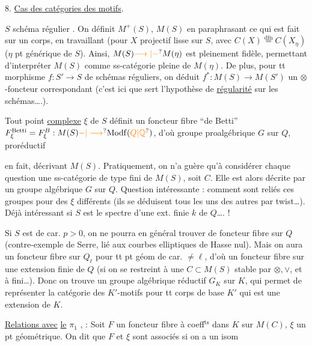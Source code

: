 8. \uline{Cas des catégories des motifs}. 

$S$ schéma régulier . On définit $M^+(S)$, $M(S)$ en paraphrasant ce qui est fait sur un corps, en travaillant (pour $X$ projectif lisse sur $S$, avec $C(X)\overset{\mathrm{dfn}}=C(X_\eta)$ ($\eta$ pt générique de $S$). Ainsi, $M(S)\unsure{\longrightarrow|-}M(\eta)$ est pleinement fidèle, permettant d'interpréter $M(S)$ comme ss-catégorie pleine de $M(\eta)$. De plus, pour tt morphisme $f:S'\longrightarrow S$ de schémas réguliers, on déduit $f^*:M(S)\longrightarrow M(S')$ un $\otimes$-foncteur correspondant (c'est ici que sert l'hypothèse de \uline{régularité} sur les schémas\ldots.).

Tout point  \uline{complexe} $\xi$ de $S$ définit un foncteur fibre ``de Betti''  $F^{\mathrm{Betti}}_\xi=F^B_\xi:M(S)\unsure{-|\longrightarrow}\mathrm{Modf}(\unsure{Q|\mathbb Q})$, d'où  groupe proalgébrique $G$ sur $Q$, proréductif

en fait,  décrivant $M(S)$. Pratiquement, on n'a guère qu'à considérer   chaque question une ss-catégorie de type fini de $M(S)$, soit $C$. Elle est alors décrite par un  groupe algébrique  $G$ sur $Q$. Question intéressante : comment sont reliés ces groupes pour des $\xi$ différents (ils se déduisent tous les uns des autres par twist\ldots). Déjà intéressant si $S$ est le spectre d'une ext. finie $k$ de $Q$\ldots. !

Si $S$ est de car. $p>0$, on ne pourra en général trouver de foncteur fibre sur $Q$ (contre-exemple de Serre, lié aux courbes elliptiques de Hasse nul). Mais on aura un foncteur fibre sur $Q_\ell$ pour tt pt géom de car. $\ne\ell$, d'où un foncteur fibre sur une extension finie  de $Q$ (si on se restreint à une $C\subset M(S)$ stable par  $\otimes,\vee$, et à \uline{} fini\ldots). Donc on trouve un groupe algébrique réductif $G_K$ sur $K$, qui permet de représenter la catégorie des $K'$-motifs pour tt corps de base $K'$ qui est une extension de $K$.

\margin{////}
 \uline{Relations avec} \uline{le} $\pi_1$ \uline{}, :  Soit $F$ un foncteur fibre à coeff$^{\mathrm{ts}}$ dans $K$ sur $M(C)$, $\xi$ un pt géométrique. On dit que $F$ et $\xi$ sont associés si on a un isom

